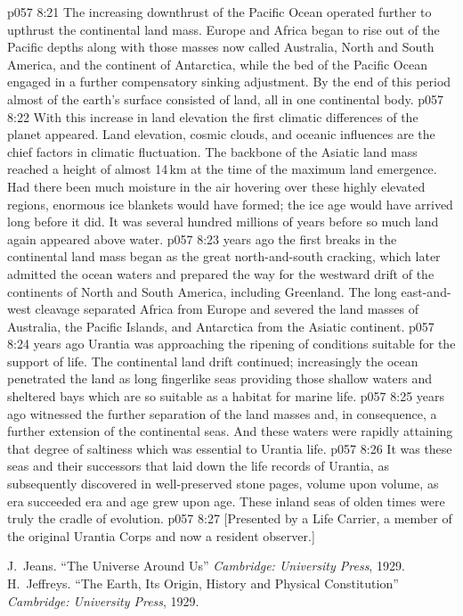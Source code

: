 \vs p057 8:21 The increasing downthrust of the Pacific Ocean operated further to upthrust the continental land mass. Europe and Africa began to rise out of the Pacific depths along with those masses now called Australia, North and South America, and the continent of Antarctica, while the bed of the Pacific Ocean engaged in a further compensatory sinking adjustment. By the end of this period almost  of the earth’s surface consisted of land, all in one continental body.
\vs p057 8:22 With this increase in land elevation the first climatic differences of the planet appeared. Land elevation, cosmic clouds, and oceanic influences are the chief factors in climatic fluctuation. The backbone of the Asiatic land mass reached a height of almost 14\,km at the time of the maximum land emergence. Had there been much moisture in the air hovering over these highly elevated regions, enormous ice blankets would have formed; the ice age would have arrived long before it did. It was several hundred millions of years before so much land again appeared above water.
\vs p057 8:23 \pc {} years ago the first breaks in the continental land mass began as the great north\hyp{}and\hyp{}south cracking, which later admitted the ocean waters and prepared the way for the westward drift of the continents of North and South America, including Greenland. The long east\hyp{}and\hyp{}west cleavage separated Africa from Europe and severed the land masses of Australia, the Pacific Islands, and Antarctica from the Asiatic continent.
\vs p057 8:24 \pc {} years ago Urantia was approaching the ripening of conditions suitable for the support of life. The continental land drift continued; increasingly the ocean penetrated the land as long fingerlike seas providing those shallow waters and sheltered bays which are so suitable as a habitat for marine life.
\vs p057 8:25 \pc {} years ago witnessed the further separation of the land masses and, in consequence, a further extension of the continental seas. And these waters were rapidly attaining that degree of saltiness which was essential to Urantia life.
\vs p057 8:26 It was these seas and their successors that laid down the life records of Urantia, as subsequently discovered in well\hyp{}preserved stone pages, volume upon volume, as era succeeded era and age grew upon age. These inland seas of olden times were truly the cradle of evolution.
\vsetoff
\vs p057 8:27 [Presented by a Life Carrier, a member of the original Urantia Corps and now a resident observer.]
\quizlink
\begin{thebibliography}{100}
J.~Jeans.
{``The Universe Around Us''}
{\em Cambridge: University Press}, 1929.
H.~Jeffreys.
{``The Earth, Its Origin, History and Physical Constitution''}
{\em Cambridge: University Press}, 1929.
\end{thebibliography}

